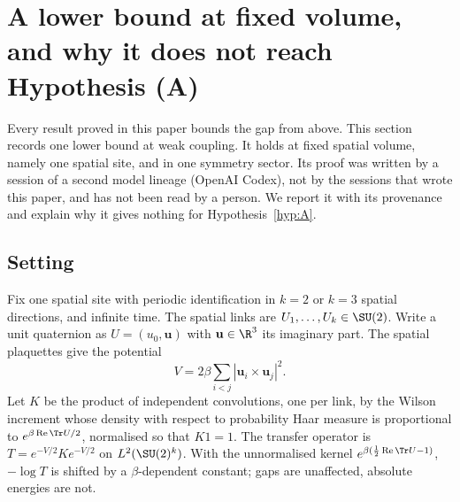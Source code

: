 
\section{A lower bound at fixed volume, and why it does not reach Hypothesis (A)}\label{sec:smallbox}

Every result proved in this paper bounds the gap from above. This section records one lower bound
at weak coupling. It holds at fixed spatial volume, namely one spatial site, and in one symmetry sector.
Its proof was written by a session of a second model lineage (OpenAI Codex), not by the sessions that
wrote this paper, and has not been read by a person. We report it with its provenance and explain why it gives nothing for
Hypothesis~\ref{hyp:A}.

\subsection{Setting}
Fix one spatial site with periodic identification in $k=2$ or $k=3$ spatial directions, and infinite
time. The spatial links are $U_1,\dots,U_k\in\SU(2)$. Write a unit quaternion as $U=(u_0,\mathbf u)$ with
$\mathbf u\in\R^3$ its imaginary part. The spatial plaquettes give the potential
\[
V=2\beta\sum_{i<j}|\mathbf u_i\times\mathbf u_j|^2 .
\]
Let $K$ be the product of independent convolutions, one per link, by the Wilson increment whose
density with respect to probability Haar measure is proportional to $e^{\beta\operatorname{Re}\Tr U/2}$,
normalised so that $K1=1$. The transfer operator is $T=e^{-V/2}Ke^{-V/2}$ on $L^2(\SU(2)^k)$. With the
unnormalised kernel $e^{\beta(\frac12\operatorname{Re}\Tr U-1)}$, $-\log T$ is shifted by a
$\beta$-dependent constant; gaps are unaffected, absolute energies are not.

